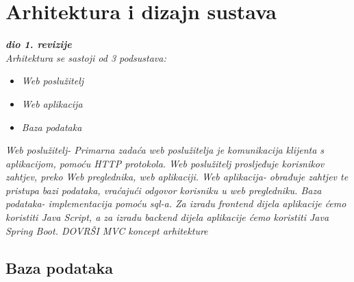 \chapter{Arhitektura i dizajn sustava}
		
		\textbf{\textit{dio 1. revizije}}\\

		\textit{Arhitektura se sastoji od 3 podsustava:}
	\begin{itemize}
		\item 	\textit{Web poslužitelj}
		\item 	\textit{Web aplikacija}
		\item 	\textit{Baza podataka}		
	\end{itemize}
		\textit{
			Web poslužitelj- Primarna zadaća web poslužitelja je komunikacija klijenta s aplikacijom, pomoću HTTP protokola. Web poslužitelj prosljeđuje korisnikov 
			zahtjev, preko Web preglednika, web aplikaciji. 
			Web aplikacija- obrađuje zahtjev te pristupa bazi podataka, vraćajući odgovor korisniku u web pregledniku.
			Baza podataka- implementacija pomoću sql-a.
			Za izradu frontend dijela aplikacije ćemo koristiti Java Script, a za izradu backend dijela aplikacije ćemo koristiti Java Spring Boot. 
			DOVRŠI MVC koncept arhitekture}\\
			
		\section{Baza podataka}
			
